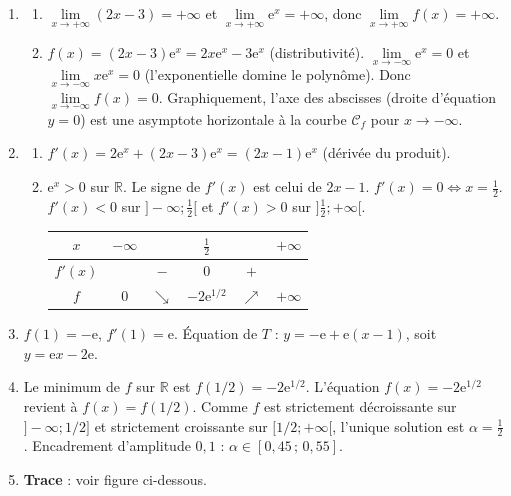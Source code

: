 \documentclass[11pt]{article}
\begin{document}
\begin{corrige}
\begin{enumerate}
\item \begin{enumerate}
\item $\lim\limits_{x\to +\infty}(2x-3)=+\infty$ et $\lim\limits_{x\to +\infty}\mathrm{e}^{x}=+\infty$, donc $\lim\limits_{x\to +\infty}f(x)=+\infty$.
\item $f(x)=(2x-3)\mathrm{e}^{x}=2x\mathrm{e}^{x}-3\mathrm{e}^{x}$ (distributivité).
  $\lim\limits_{x\to -\infty}\mathrm{e}^{x}=0$ et $\lim\limits_{x\to -\infty}x\mathrm{e}^{x}=0$ (l'exponentielle domine le polynôme).
  Donc $\lim\limits_{x\to -\infty}f(x)=0$.
  Graphiquement, l'axe des abscisses (droite d'équation $y=0$) est une asymptote horizontale à la courbe $\mathcal{C}_{f}$ pour $x\to -\infty$.
\end{enumerate}
\item \begin{enumerate}
\item $f'(x)=2\mathrm{e}^{x}+(2x-3)\mathrm{e}^{x}=(2x-1)\mathrm{e}^{x}$ (dérivée du produit).
\item $\mathrm{e}^{x}>0$ sur $\mathbb{R}$. Le signe de $f'(x)$ est celui de $2x-1$.
  $f'(x)=0 \Leftrightarrow x=\frac{1}{2}$.
  $f'(x)<0$ sur $]-\infty;\frac{1}{2}[$ et $f'(x)>0$ sur $]\frac{1}{2};+\infty[$.
  \begin{center}
  \begin{tabular}{|c|ccccc|}\hline
  $x$ & $-\infty$ & & $\frac{1}{2}$ & & $+\infty$ \\ \hline
  $f'(x)$ & & $-$ & $0$ & $+$ & \\ \hline
  $f$ & $0$ & $\searrow$ & $-2\mathrm{e}^{1/2}$ & $\nearrow$ & $+\infty$ \\ \hline
  \end{tabular}
  \end{center}
\end{enumerate}
\item $f(1)=-\mathrm{e}$, $f'(1)=\mathrm{e}$.
  Équation de $T$ : $y = -\mathrm{e} + \mathrm{e}(x-1)$, soit $\boxed{y = \mathrm{e}x - 2\mathrm{e}}$.
\item Le minimum de $f$ sur $\mathbb{R}$ est $f(1/2)=-2\mathrm{e}^{1/2}$.
  L'équation $f(x)=-2\mathrm{e}^{1/2}$ revient à $f(x)=f(1/2)$.
  Comme $f$ est strictement décroissante sur $]-\infty;1/2]$ et strictement croissante sur $[1/2;+\infty[$, l'unique solution est $\alpha=\frac{1}{2}$.
  Encadrement d'amplitude $0,1$ : $\alpha \in [0{,}45\,;\,0{,}55]$.
\item \textbf{Trace} : voir figure ci-dessous.
\end{enumerate}


\end{corrige}
\end{document}
